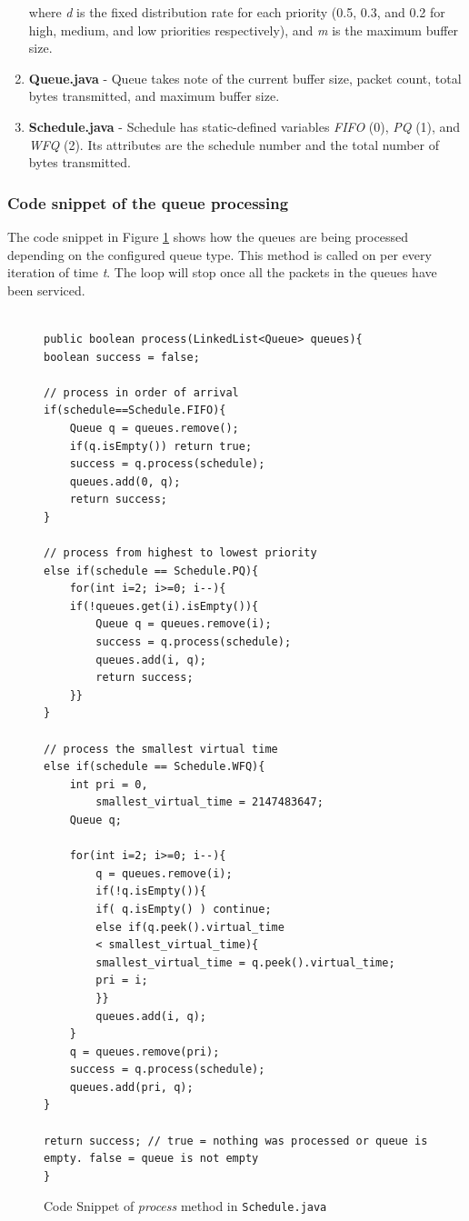 \documentclass[journal]{IEEE/IEEEtran}
\begin{document}
\begin{enumerate}
where \textit{d} is the fixed distribution rate for each priority (0.5, 0.3, and 0.2 for high, medium, and low priorities respectively), and \textit{m} is the maximum buffer size.

\item \textbf{Queue.java} - Queue takes note of the current buffer size, packet count, total bytes transmitted, and maximum buffer size.

\item \textbf{Schedule.java} - Schedule has static-defined variables \textit{FIFO} (0), \textit{PQ} (1), and \textit{WFQ} (2). Its attributes are the schedule number and the total number of bytes transmitted.
\end{enumerate}

\subsubsection{Code snippet of the queue processing}
The code snippet in Figure \ref{fig:snippet} shows how the queues are being processed depending on the configured queue type. This method is called on per every iteration of time \textit{t}. The loop will stop once all the packets in the queues have been serviced.
\begin{figure}
\begin{lstlisting}

public boolean process(LinkedList<Queue> queues){
boolean success = false;

// process in order of arrival
if(schedule==Schedule.FIFO){
	Queue q = queues.remove();
	if(q.isEmpty()) return true;
	success = q.process(schedule);
	queues.add(0, q);
	return success;
}

// process from highest to lowest priority
else if(schedule == Schedule.PQ){
	for(int i=2; i>=0; i--){
	if(!queues.get(i).isEmpty()){
		Queue q = queues.remove(i);
		success = q.process(schedule);
		queues.add(i, q);
		return success;
 	}}
}

// process the smallest virtual time
else if(schedule == Schedule.WFQ){
	int pri = 0,
		smallest_virtual_time = 2147483647;
	Queue q;

	for(int i=2; i>=0; i--){
		q = queues.remove(i);
		if(!q.isEmpty()){					
		if( q.isEmpty() ) continue;
		else if(q.peek().virtual_time 
		< smallest_virtual_time){
		smallest_virtual_time = q.peek().virtual_time;
		pri = i;
		}}
		queues.add(i, q);
	}
	q = queues.remove(pri);
	success = q.process(schedule);
	queues.add(pri, q);
}

return success;	// true = nothing was processed or queue is empty. false = queue is not empty
}
\end{lstlisting}
\label{fig:snippet}\caption{Code Snippet of \textit{process} method in \texttt{Schedule.java}}
\end{figure}
\end{document}
